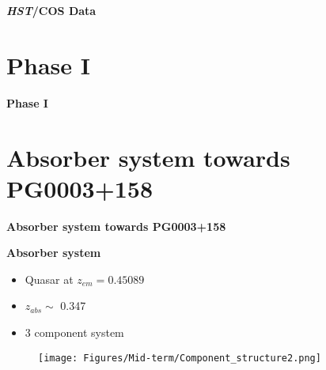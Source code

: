 \documentclass[aspectratio=169]{beamer}
\begin{document}
\begin{frame}{\huge{{\textbf{\textit{HST}/COS Data}}}}


\end{frame}


\section{Phase I}

\begin{frame}{}

{\huge{\textbf{Phase I}}}

\end{frame}


\section{Absorber system towards PG0003+158}


\begin{frame}{}

{\huge{\textbf{Absorber system towards PG0003+158}}}

\end{frame}


\begin{frame}{\huge{{\textbf{Absorber system}}}}

\begin{itemize}
    \item Quasar at $z_{em}=0.45089$
    \item $z_{abs} \sim$ 0.347
    \item 3 component system
\end{itemize}

\begin{figure}[!htbp]
      \centering
      \texttt{[image: Figures/Mid-term/Component\_structure2.png]}
\end{figure}

\end{frame}
\end{document}
